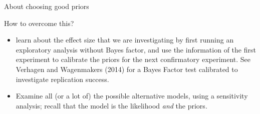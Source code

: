 \documentclass[12pt,ignorenonframetext,aspectratio=169]{beamer}
\begin{document}
\begin{frame}{About choosing good priors}
\protect\hypertarget{about-choosing-good-priors-1}{}

How to overcome this?

\begin{itemize}
\item
  learn about the effect size that we are investigating by first running an exploratory analysis without Bayes factor, and use the information of the first experiment to calibrate the priors for the next confirmatory experiment. See Verhagen and Wagenmakers (2014) for a Bayes Factor test calibrated to investigate replication success.
\item
  Examine all (or a lot of) the possible alternative models, using a sensitivity analysis; recall that the model is the likelihood \emph{and} the priors.
\end{itemize}

\end{frame}
\end{document}
